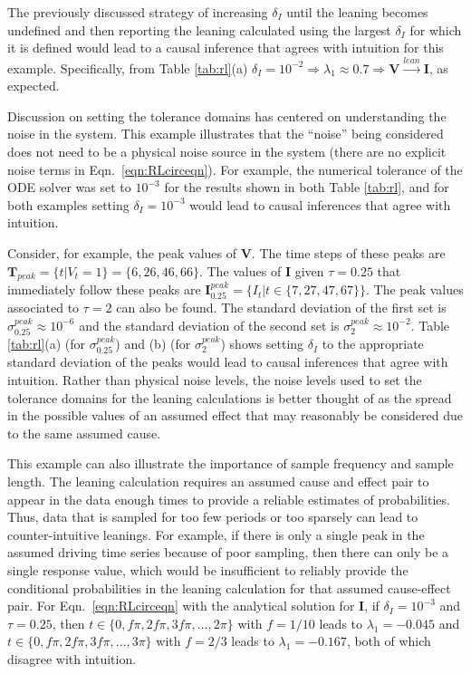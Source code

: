 \documentclass[twocolumn,aps,pre,groupedaddress]{revtex4-1}
\begin{document}
The previously discussed strategy of increasing $\delta_I$ until the leaning becomes undefined and then reporting the leaning calculated using the largest $\delta_I$ for which it is defined would lead to a causal inference that agrees with intuition for this example.  Specifically, from Table \ref{tab:rl}(a) $\delta_I=10^{-2}\Rightarrow\lambda_1\approx 0.7\Rightarrow\mathbf{V}\xrightarrow{lean}\mathbf{I}$, as expected.  

Discussion on setting the tolerance domains has centered on understanding the noise in the system.  This example illustrates that the ``noise'' being considered does not need to be a physical noise source in the system (there are no explicit noise terms in Eqn.\ \ref{eqn:RLcirceqn}).  For example, the numerical tolerance of the ODE solver was set to $10^{-3}$ for the results shown in both Table \ref{tab:rl}, and for both examples setting $\delta_I=10^{-3}$ would lead to causal inferences that agree with intuition.  

Consider, for example, the peak values of $\mathbf{V}$.  The time steps of these peaks are $\mathbf{T}_{peak} = \{t|V_t =1\} = \{6,26,46,66\}$.  The values of $\mathbf{I}$ given $\tau = 0.25$ that immediately follow these peaks are $\mathbf{I}^{peak}_{0.25} = \{I_t|t\in\{7,27,47,67\}\}$.  The peak values associated to $\tau=2$ can also be found.  The standard deviation of the first set is $\sigma_{0.25}^{peak} \approx 10^{-6}$ and the standard deviation of the second set is $\sigma_{2}^{peak} \approx 10^{-2}$.  Table \ref{tab:rl}(a) (for $\sigma_{0.25}^{peak}$) and (b) (for $\sigma_{2}^{peak}$) shows setting $\delta_I$ to the appropriate standard deviation of the peaks would lead to causal inferences that agree with intuition.  Rather than physical noise levels, the noise levels used to set the tolerance domains for the leaning calculations is better thought of as the spread in the possible values of an assumed effect that may reasonably be considered due to the same assumed cause.  
    
This example can also illustrate the importance of sample frequency and sample length.  The leaning calculation requires an assumed cause and effect pair to appear in the data enough times to provide a reliable estimates of probabilities.  Thus, data that is sampled for too few periods or too sparsely can lead to counter-intuitive leanings.  For example, if there is only a single peak in the assumed driving time series because of poor sampling, then there can only be a single response value, which would be insufficient to reliably provide the conditional probabilities in the leaning calculation for that assumed cause-effect pair.  For Eqn.\ \ref{eqn:RLcirceqn} with the analytical solution for $\mathbf{I}$, if $\delta_I=10^{-3}$ and $\tau = 0.25$, then $t\in\{0,f\pi,2f\pi,3f\pi,\ldots,2\pi\}$ with $f=1/10$ leads to $\lambda_1 = -0.045$ and $t\in\{0,f\pi,2f\pi,3f\pi,\ldots,3\pi\}$ with $f=2/3$ leads to $\lambda_1 = -0.167$, both of which disagree with intuition.
\end{document}
